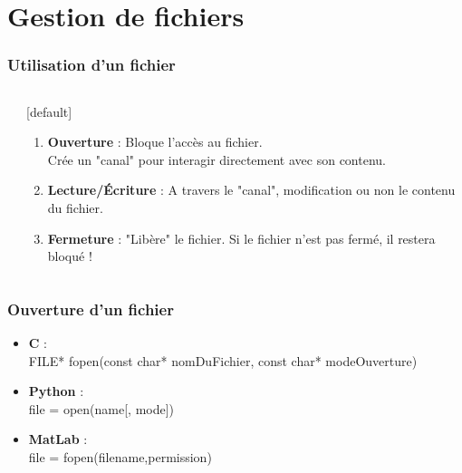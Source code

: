 \documentclass{beamer}
\begin{document}
	\section{Gestion de fichiers}
	\begin{frame}
	\frametitle{Utilisation d'un fichier}
	\begin{columns}[c]
		\begin{column}{5cm}
			\begin{center}
			\end{center}
		\end{column}
		\begin{column}{5cm}
			\begin{enumerate}
				\item {\bfseries Ouverture} : Bloque l'accès au fichier. \\
				Crée un "canal" pour interagir directement avec son contenu.
				\item {\bfseries Lecture/Écriture} : A travers le "canal", modification ou non le contenu du fichier.
				\item {\bfseries Fermeture} : "Libère" le fichier. Si le fichier n'est pas fermé, il restera bloqué !
			\end{enumerate}
		\end{column}
	\end{columns}
	\end{frame}
	
	\begin{frame}%
		\frametitle{Ouverture d'un fichier}
		\begin{itemize}
			\item  {\bfseries C} : \\
			 FILE* fopen(const char* nomDuFichier, const char* modeOuverture) 
			 \item  {\bfseries Python} : \\
			 file = open(name[, mode])
			 \item  {\bfseries MatLab} : \\
			 file = fopen(filename,permission)
		\end{itemize}
	\end{frame}
\end{document}
